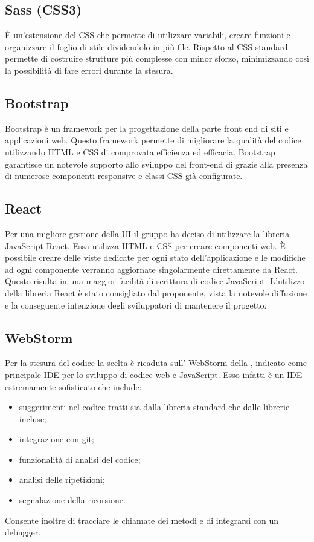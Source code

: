 \subsection{Sass (CSS3)}
È un'estensione del CSS che permette di utilizzare variabili, creare funzioni e organizzare il foglio di stile dividendolo in più file. Rispetto al CSS standard permette di costruire strutture più complesse con minor sforzo, minimizzando così la possibilità di fare errori durante la stesura.

\subsection{Bootstrap}
Bootstrap è un framework per la progettazione della parte front end di siti e applicazioni web. Questo framework permette di migliorare la qualità del codice utilizzando  HTML e CSS di comprovata efficienza ed efficacia. Bootstrap garantisce un notevole supporto allo sviluppo del front-end di \ProjectName{} grazie alla presenza di numerose componenti responsive e classi CSS già configurate.

\subsection{React}
Per una migliore gestione della UI il gruppo ha deciso di utilizzare la libreria JavaScript React. Essa utilizza HTML e CSS per creare componenti web. È possibile creare delle viste dedicate per ogni stato dell'applicazione e le modifiche ad ogni componente verranno aggiornate singolarmente direttamente da React. Questo risulta in una maggior facilità di scrittura di codice JavaScript. L'utilizzo della libreria React è stato consigliato dal proponente, vista la notevole diffusione e la conseguente intenzione degli sviluppatori di mantenere il progetto.

\subsection{WebStorm}
Per la stesura del codice la scelta è ricaduta sull' WebStorm della , indicato come principale IDE per lo sviluppo di codice web e JavaScript. Esso infatti è un IDE estremamente sofisticato che include:
\begin{itemize}
	\item suggerimenti nel codice tratti sia dalla libreria standard che dalle librerie incluse;
	\item integrazione con git;
	\item funzionalità di analisi del codice;
	\item analisi delle ripetizioni;
	\item segnalazione della ricorsione.
\end{itemize}
Consente inoltre di tracciare le chiamate dei metodi e di integrarsi con un debugger.
